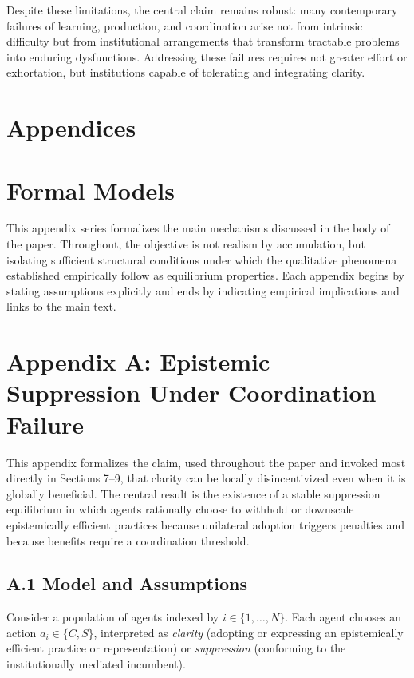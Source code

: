 \documentclass[11pt]{article}
\begin{document}
Despite these limitations, the central claim remains robust: many contemporary failures of learning, production, and coordination arise not from intrinsic difficulty but from institutional arrangements that transform tractable problems into enduring dysfunctions. Addressing these failures requires not greater effort or exhortation, but institutions capable of tolerating and integrating clarity.

\newpage
\section*{Appendices}

\appendix

\section{Formal Models}

This appendix series formalizes the main mechanisms discussed in the body of the paper. Throughout, the objective is not realism by accumulation, but isolating sufficient structural conditions under which the qualitative phenomena established empirically follow as equilibrium properties. Each appendix begins by stating assumptions explicitly and ends by indicating empirical implications and links to the main text.

\section{Appendix A: Epistemic Suppression Under Coordination Failure}
\label{app:epistemic-suppression}

This appendix formalizes the claim, used throughout the paper and invoked most directly in Sections 7--9, that clarity can be locally disincentivized even when it is globally beneficial. The central result is the existence of a stable suppression equilibrium in which agents rationally choose to withhold or downscale epistemically efficient practices because unilateral adoption triggers penalties and because benefits require a coordination threshold.

\subsection{A.1 Model and Assumptions}

Consider a population of agents indexed by \(i \in \{1,\dots,N\}\). Each agent chooses an action \(a_i \in \{C,S\}\), interpreted as \emph{clarity} (adopting or expressing an epistemically efficient practice or representation) or \emph{suppression} (conforming to the institutionally mediated incumbent).
\end{document}
